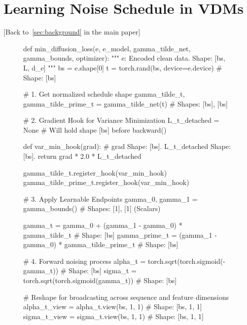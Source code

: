 \documentclass{article}
\begin{document}
%

%
%
%
%
%
%
%
%
%
%
%
%
%
%
%
%
%

%

%
%
%
%
%
%
%
%
%
%
%
%
%
%

%

%

%
%
%
%
%
%
%
%
%
%


%
%
%
%
%
%


%


%
\section{Learning Noise Schedule in VDMs}
\label{app:noise-schedule-vdm}

[Back to~\cref{sec:background} in the main paper]

\begin{figure}[H]
\centering   
\begin{minipage}{\linewidth}
\footnotesize
\begin{python}
def min_diffusion_loss(e, e_model, gamma_tilde_net, gamma_bounds, optimizer):
    """
    e: Encoded clean data. Shape: [bs, L, d_e]
    """
    bs = e.shape[0]
    t = torch.rand(bs, device=e.device)  # Shape: [bs]
    
    # 1. Get normalized schedule shape
    gamma_tilde_t, gamma_tilde_prime_t = gamma_tilde_net(t)  
    # Shapes: [bs], [bs]
    
    # 2. Gradient Hook for Variance Minimization
    L_t_detached = None  # Will hold shape [bs] before backward()
    
    def var_min_hook(grad):
        # grad Shape: [bs]. L_t_detached Shape: [bs]. 
        return grad * 2.0 * L_t_detached
        
    gamma_tilde_t.register_hook(var_min_hook)
    gamma_tilde_prime_t.register_hook(var_min_hook)
    
    # 3. Apply Learnable Endpoints
    gamma_0, gamma_1 = gamma_bounds()  # Shapes: [1], [1] (Scalars)
    
    gamma_t = gamma_0 + (gamma_1 - gamma_0) * gamma_tilde_t  # Shape: [bs]
    gamma_prime_t = (gamma_1 - gamma_0) * gamma_tilde_prime_t  # Shape: [bs]
    
    # 4. Forward noising process
    alpha_t = torch.sqrt(torch.sigmoid(-gamma_t))  # Shape: [bs]
    sigma_t = torch.sqrt(torch.sigmoid(gamma_t))  # Shape: [bs]
    
    # Reshape for broadcasting across sequence and feature dimensions
    alpha_t_view = alpha_t.view(bs, 1, 1)  # Shape: [bs, 1, 1]
    sigma_t_view = sigma_t.view(bs, 1, 1)  # Shape: [bs, 1, 1]
    

\end{python}
\end{minipage}
\end{figure}
\end{document}
